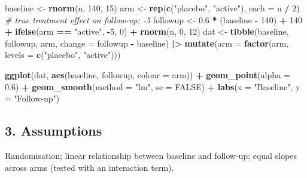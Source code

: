 \documentclass[
]{article}
\newenvironment{Shaded}{\begin{snugshade}}{\end{snugshade}}
\newcommand{\AttributeTok}[1]{\textcolor[rgb]{0.13,0.29,0.53}{#1}}
\newcommand{\CommentTok}[1]{\textcolor[rgb]{0.56,0.35,0.01}{\textit{#1}}}
\newcommand{\ConstantTok}[1]{\textcolor[rgb]{0.56,0.35,0.01}{#1}}
\newcommand{\DecValTok}[1]{\textcolor[rgb]{0.00,0.00,0.81}{#1}}
\newcommand{\FloatTok}[1]{\textcolor[rgb]{0.00,0.00,0.81}{#1}}
\newcommand{\FunctionTok}[1]{\textcolor[rgb]{0.13,0.29,0.53}{\textbf{#1}}}
\newcommand{\NormalTok}[1]{#1}
\newcommand{\OtherTok}[1]{\textcolor[rgb]{0.56,0.35,0.01}{#1}}
\newcommand{\SpecialCharTok}[1]{\textcolor[rgb]{0.81,0.36,0.00}{\textbf{#1}}}
\newcommand{\StringTok}[1]{\textcolor[rgb]{0.31,0.60,0.02}{#1}}
\begin{document}
\begin{Shaded}
\begin{Highlighting}[]
\NormalTok{baseline }\OtherTok{\textless{}{-}} \FunctionTok{rnorm}\NormalTok{(n, }\DecValTok{140}\NormalTok{, }\DecValTok{15}\NormalTok{)}
\NormalTok{arm }\OtherTok{\textless{}{-}} \FunctionTok{rep}\NormalTok{(}\FunctionTok{c}\NormalTok{(}\StringTok{"placebo"}\NormalTok{, }\StringTok{"active"}\NormalTok{), }\AttributeTok{each =}\NormalTok{ n }\SpecialCharTok{/} \DecValTok{2}\NormalTok{)}
\CommentTok{\# true treatment effect on follow{-}up: {-}5}
\NormalTok{followup }\OtherTok{\textless{}{-}} \FloatTok{0.6} \SpecialCharTok{*}\NormalTok{ (baseline }\SpecialCharTok{{-}} \DecValTok{140}\NormalTok{) }\SpecialCharTok{+} \DecValTok{140} \SpecialCharTok{+}
  \FunctionTok{ifelse}\NormalTok{(arm }\SpecialCharTok{==} \StringTok{"active"}\NormalTok{, }\SpecialCharTok{{-}}\DecValTok{5}\NormalTok{, }\DecValTok{0}\NormalTok{) }\SpecialCharTok{+} \FunctionTok{rnorm}\NormalTok{(n, }\DecValTok{0}\NormalTok{, }\DecValTok{12}\NormalTok{)}
\NormalTok{dat }\OtherTok{\textless{}{-}} \FunctionTok{tibble}\NormalTok{(baseline, followup, arm,}
              \AttributeTok{change =}\NormalTok{ followup }\SpecialCharTok{{-}}\NormalTok{ baseline) }\SpecialCharTok{|\textgreater{}}
  \FunctionTok{mutate}\NormalTok{(}\AttributeTok{arm =} \FunctionTok{factor}\NormalTok{(arm, }\AttributeTok{levels =} \FunctionTok{c}\NormalTok{(}\StringTok{"placebo"}\NormalTok{, }\StringTok{"active"}\NormalTok{)))}

\FunctionTok{ggplot}\NormalTok{(dat, }\FunctionTok{aes}\NormalTok{(baseline, followup, }\AttributeTok{colour =}\NormalTok{ arm)) }\SpecialCharTok{+}
  \FunctionTok{geom\_point}\NormalTok{(}\AttributeTok{alpha =} \FloatTok{0.6}\NormalTok{) }\SpecialCharTok{+}
  \FunctionTok{geom\_smooth}\NormalTok{(}\AttributeTok{method =} \StringTok{"lm"}\NormalTok{, }\AttributeTok{se =} \ConstantTok{FALSE}\NormalTok{) }\SpecialCharTok{+}
  \FunctionTok{labs}\NormalTok{(}\AttributeTok{x =} \StringTok{"Baseline"}\NormalTok{, }\AttributeTok{y =} \StringTok{"Follow{-}up"}\NormalTok{)}
\end{Highlighting}
\end{Shaded}

\subsection{3. Assumptions}\label{assumptions}

Randomisation; linear relationship between baseline and follow-up; equal
slopes across arms (tested with an interaction term).
\end{document}
